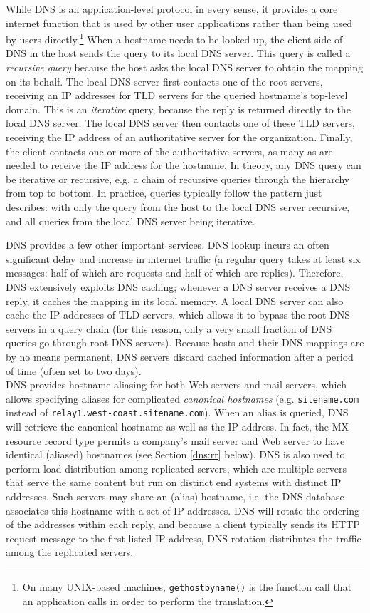 \documentclass[table, xcdraw]{article}%
\begin{document}
While DNS is an application-level protocol in every sense, it provides a core internet function that is used by other user applications rather than being used by users directly.\footnote{On many UNIX-based machines, \texttt{gethostbyname()} is the function call that an application calls in order to perform the translation.} When a hostname needs to be looked up, the client side of DNS in the host sends the query to its local DNS server. This query is called a \emph{recursive query} because the host asks the local DNS server to obtain the mapping on its behalf. The local DNS server first contacts one of the root servers, receiving an IP addresses for TLD servers for the queried hostname's top-level domain. This is an \emph{iterative} query, because the reply is returned directly to the local DNS server. The local DNS server then contacts one of these TLD servers, receiving the IP address of an authoritative server for the organization. Finally, the client contacts one or more of the authoritative servers, as many as are needed to receive the IP address for the hostname. In theory, any DNS query can be iterative or recursive, e.g. a chain of recursive queries through the hierarchy from top to bottom. In practice, queries typically follow the pattern just describes: with only the query from the host to the local DNS server recursive, and all queries from the local DNS server being iterative.

DNS provides a few other important services. DNS lookup incurs an often significant delay and increase in internet traffic (a regular query takes at least six messages: half of which are requests and half of which are replies). Therefore, DNS extensively exploits DNS caching; whenever a DNS server receives a DNS reply, it caches the mapping in its local memory. A local DNS server can also cache the IP addresses of TLD servers, which allows it to bypass the root DNS servers in a query chain (for this reason, only a very small fraction of DNS queries go through root DNS servers). Because hosts and their DNS mappings are by no means permanent, DNS servers discard cached information after a period of time (often set to two days).\\
DNS provides hostname aliasing for both Web servers and mail servers, which allows specifying aliases for complicated \emph{canonical hostnames} (e.g. \texttt{sitename.com} instead of \texttt{relay1.west-coast.sitename.com}). When an alias is queried, DNS will retrieve the canonical hostname as well as the IP address. In fact, the MX resource record type permits a company's mail server and Web server to have identical (aliased) hostnames (see Section \ref{dns:rr} below). DNS is also used to perform load distribution among replicated servers, which are multiple servers that serve the same content but run on distinct end systems with distinct IP addresses. Such servers may share an (alias) hostname, i.e. the DNS database associates this hostname with a set of IP addresses. DNS will rotate the ordering of the addresses within each reply, and because a client typically sends its HTTP request message to the first listed IP address, DNS rotation distributes the traffic among the replicated servers.
\end{document}
